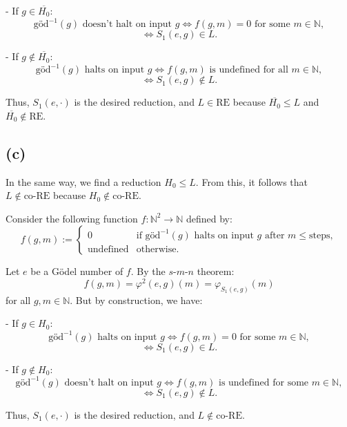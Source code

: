 - If $g \in \overline{H_0}$:
  \[
  \text{göd}^{-1}(g) \text{ doesn't halt on input } g \iff f(g, m) = 0 \text{ for some } m \in \mathbb{N},
  \]
  \[
  \iff S_1(e, g) \in L.
  \]

- If $g \notin \overline{H_0}$:
  \[
  \text{göd}^{-1}(g) \text{ halts on input } g \iff f(g, m) \text{ is undefined for all } m \in \mathbb{N},
  \]
  \[
  \iff S_1(e, g) \notin L.
  \]

Thus, $S_1(e, \cdot)$ is the desired reduction, and $L \in \text{RE}$ because $\overline{H_0} \leq L$ and $\overline{H_0} \notin \text{RE}$.


\subsection{(c)}


In the same way, we find a reduction $H_0 \leq L$. From this, it follows that $L \notin \text{co-RE}$ because $H_0 \notin \text{co-RE}$.

\bigskip

Consider the following function $f: \mathbb{N}^2 \to \mathbb{N}$ defined by:
\[
f(g, m) :=
\begin{cases}
    0 & \text{if } \text{göd}^{-1}(g) \text{ halts on input } g \text{ after } m \leq \text{steps}, \\
    \text{undefined} & \text{otherwise}.
\end{cases}
\]

Let $e$ be a Gödel number of $f$. By the $s$-$m$-$n$ theorem:
\[
f(g, m) = \varphi^2(e, g)(m) = \varphi_{S_1(e, g)}(m)
\]
for all $g, m \in \mathbb{N}$. But by construction, we have:

- If $g \in H_0$:
  \[
  \text{göd}^{-1}(g) \text{ halts on input } g \iff f(g, m) = 0 \text{ for some } m \in \mathbb{N},
  \]
  \[
  \iff S_1(e, g) \in L.
  \]

- If $g \notin H_0$:
  \[
  \text{göd}^{-1}(g) \text{ doesn't halt on input } g \iff f(g, m) \text{ is undefined for some } m \in \mathbb{N},
  \]
  \[
  \iff S_1(e, g) \notin L.
  \]

Thus, $S_1(e, \cdot)$ is the desired reduction, and $L \notin \text{co-RE}$.


